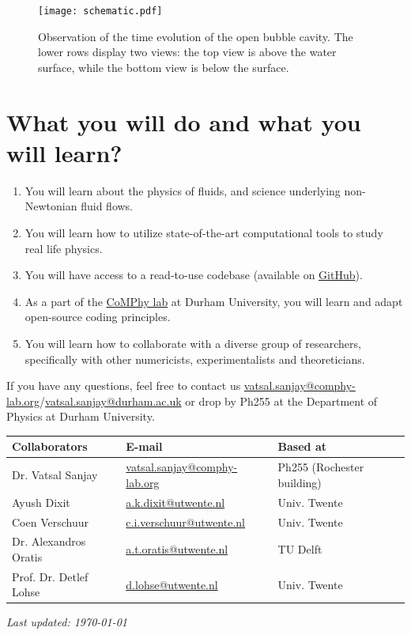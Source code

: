 \documentclass[11pt]{article}
\begin{document}
\begin{figure}[H]
\begin{center}
 \texttt{[image: schematic.pdf]}
 \caption{Observation of the time evolution of the open bubble cavity. The lower rows display two views: the top view is above the water surface, while the bottom view is below the surface. }
 \label{Figure::Waves}
\end{center}
\end{figure}
\section*{What you will do and what you will learn?}

\begin{enumerate}
\item You will learn about the physics of fluids, and science underlying non-Newtonian fluid flows. 
\item You will learn how to utilize state-of-the-art computational tools to study real life physics. 
\item You will have access to a read-to-use codebase (available on \href{https://github.com/comphy-lab/Viscoelastic-Worthington-jets-and-droplets-produced-by-bursting-bubbles}{GitHub}).
\item As a part of the \href{https://comphy-lab.org}{CoMPhy lab} at Durham University, you will learn and adapt open-source coding principles. 
\item You will learn how to collaborate with a diverse group of researchers, specifically with other numericists, experimentalists and theoreticians.

\end{enumerate}

\noindent If you have any questions, feel free to contact us \href{mailto:vatsal.sanjay@comphy-lab.org}{vatsal.sanjay@comphy-lab.org}/\href{mailto:vatsal.sanjay@durham.ac.uk}{vatsal.sanjay@durham.ac.uk} or drop by Ph255 at the Department of Physics at Durham University.

\begin{center}
\begin{tabular}{|l|l|l|}
\hline \textbf{Collaborators} & \textbf{E-mail} & \textbf{Based at} \\
\hline Dr. Vatsal Sanjay & \href{mailto:vatsal.sanjay@comphy-lab.org}{vatsal.sanjay@comphy-lab.org} & Ph255 (Rochester building) \\
\hline Ayush Dixit & \href{mailto:a.k.dixit@utwente.nl}{a.k.dixit@utwente.nl} & Univ. Twente \\
\hline Coen Verschuur & \href{mailto:c.i.verschuur@utwente.nl}{c.i.verschuur@utwente.nl} & Univ. Twente \\
\hline Dr. Alexandros Oratis   & \href{mailto:a.t.oratis@utwente.nl}{a.t.oratis@utwente.nl}& TU Delft \\
\hline Prof. Dr. Detlef Lohse & \href{mailto:d.lohse@utwente.nl}{d.lohse@utwente.nl} & Univ. Twente  \\
\hline
\end{tabular}
\end{center}

\vspace{1em}
\noindent\textit{Last updated: \today}

\printbibliography
\end{document}

